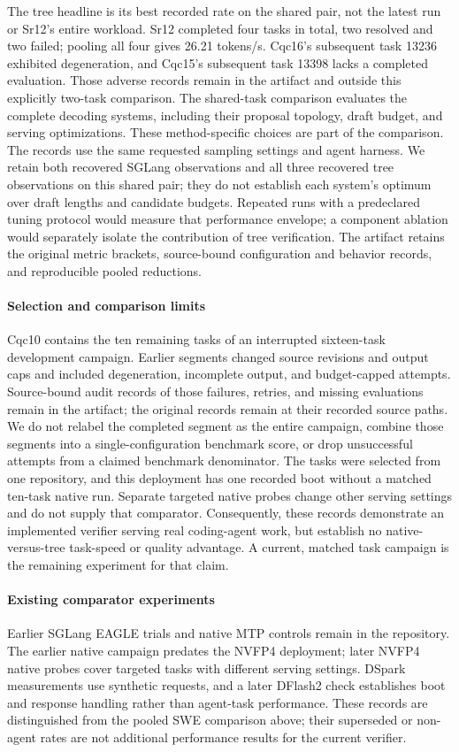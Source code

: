 The tree headline is its best recorded rate on the shared pair, not the latest run or Sr12's entire workload. Sr12 completed four tasks in total, two resolved and two failed; pooling all four gives 26.21 tokens/s. Cqc16's subsequent task 13236 exhibited degeneration, and Cqc15's subsequent task 13398 lacks a completed evaluation. Those adverse records remain in the artifact and outside this explicitly two-task comparison. The shared-task comparison evaluates the complete decoding systems, including their proposal topology, draft budget, and serving optimizations. These method-specific choices are part of the comparison. The records use the same requested sampling settings and agent harness. We retain both recovered SGLang observations and all three recovered tree observations on this shared pair; they do not establish each system's optimum over draft lengths and candidate budgets. Repeated runs with a predeclared tuning protocol would measure that performance envelope; a component ablation would separately isolate the contribution of tree verification. The artifact retains the original metric brackets, source-bound configuration and behavior records, and reproducible pooled reductions.

\paragraph{Selection and comparison limits}
Cqc10 contains the ten remaining tasks of an interrupted sixteen-task development campaign. Earlier segments changed source revisions and output caps and included degeneration, incomplete output, and budget-capped attempts. Source-bound audit records of those failures, retries, and missing evaluations remain in the artifact; the original records remain at their recorded source paths. We do not relabel the completed segment as the entire campaign, combine those segments into a single-configuration benchmark score, or drop unsuccessful attempts from a claimed benchmark denominator. The tasks were selected from one repository, and this deployment has one recorded boot without a matched ten-task native run. Separate targeted native probes change other serving settings and do not supply that comparator. Consequently, these records demonstrate an implemented verifier serving real coding-agent work, but establish no native-versus-tree task-speed or quality advantage. A current, matched task campaign is the remaining experiment for that claim.


\paragraph{Existing comparator experiments}
Earlier SGLang EAGLE trials and native MTP controls remain in the repository. The earlier native campaign predates the NVFP4 deployment; later NVFP4 native probes cover targeted tasks with different serving settings. DSpark measurements use synthetic requests, and a later DFlash2 check establishes boot and response handling rather than agent-task performance. These records are distinguished from the pooled SWE comparison above; their superseded or non-agent rates are not additional performance results for the current verifier.
